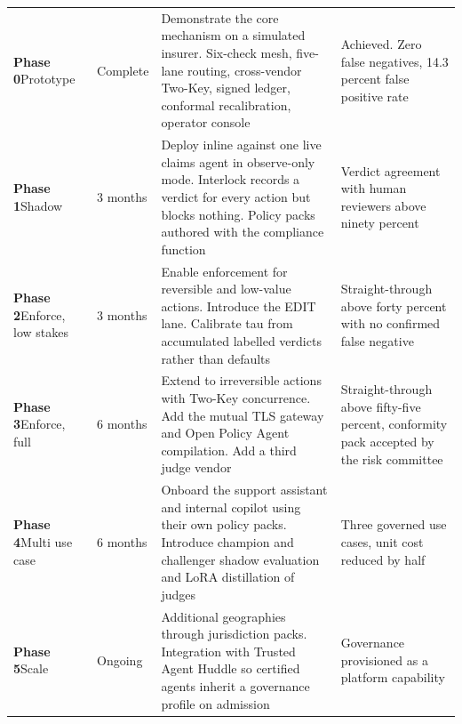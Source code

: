 \documentclass[10pt]{article}
\begin{document}
\vspace{2pt}
{\small
\begin{xltabular}{\textwidth}{@{}L{0.13\textwidth}L{0.09\textwidth}YL{0.21\textwidth}@{}}
\toprule
{} &  &  &  \\
\midrule
\textbf{Phase 0}\newline Prototype & Complete & Demonstrate the core mechanism on a simulated insurer. Six-check mesh, five-lane routing, cross-vendor Two-Key, signed ledger, conformal recalibration, operator console & \textcolor{ok}{Achieved. Zero false negatives, 14.3 percent false positive rate} \\
\textbf{Phase 1}\newline Shadow & 3 months & Deploy inline against one live claims agent in observe-only mode. Interlock records a verdict for every action but blocks nothing. Policy packs authored with the compliance function & Verdict agreement with human reviewers above ninety percent \\
\textbf{Phase 2}\newline Enforce, low stakes & 3 months & Enable enforcement for reversible and low-value actions. Introduce the EDIT lane. Calibrate tau from accumulated labelled verdicts rather than defaults & Straight-through above forty percent with no confirmed false negative \\
\textbf{Phase 3}\newline Enforce, full & 6 months & Extend to irreversible actions with Two-Key concurrence. Add the mutual TLS gateway and Open Policy Agent compilation. Add a third judge vendor & Straight-through above fifty-five percent, conformity pack accepted by the risk committee \\
\textbf{Phase 4}\newline Multi use case & 6 months & Onboard the support assistant and internal copilot using their own policy packs. Introduce champion and challenger shadow evaluation and LoRA distillation of judges & Three governed use cases, unit cost reduced by half \\
\textbf{Phase 5}\newline Scale & Ongoing & Additional geographies through jurisdiction packs. Integration with Trusted Agent Huddle so certified agents inherit a governance profile on admission & Governance provisioned as a platform capability \\
\bottomrule
\end{xltabular}}
\end{document}
